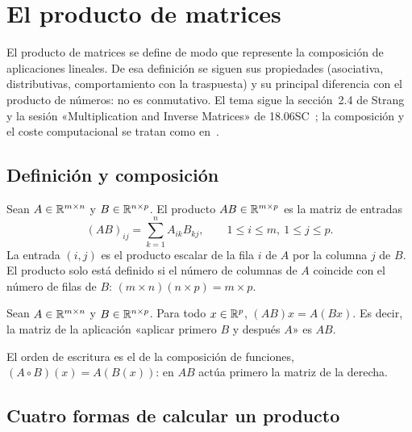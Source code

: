 \chapter{El producto de matrices}
\label{tema:4}

El producto de matrices se define de modo que represente la composición de aplicaciones lineales. De esa definición se siguen sus propiedades (asociativa, distributivas, comportamiento con la traspuesta) y su principal diferencia con el producto de números: no es conmutativo. El tema sigue la sección~2.4 de Strang~\cite{strang} y la sesión «Multiplication and Inverse Matrices» de 18.06SC~\cite{mit1806sc}; la composición y el coste computacional se tratan como en~\cite[§10.1 y §10.2]{vmls}.

\section{Definición y composición}

\begin{definicion}\label{def:producto}
Sean $A\in\mathbb{R}^{m\times n}$ y $B\in\mathbb{R}^{n\times p}$. El producto $AB\in\mathbb{R}^{m\times p}$ es la matriz de entradas
\[
(AB)_{ij}=\sum_{k=1}^{n}A_{ik}B_{kj},\qquad 1\le i\le m,\ 1\le j\le p.
\]
La entrada $(i,j)$ es el producto escalar de la fila $i$ de $A$ por la columna $j$ de $B$. El producto solo está definido si el número de columnas de $A$ coincide con el número de filas de $B$: $(m\times n)(n\times p)=m\times p$.
\end{definicion}

\begin{teorema}\label{teo:composicion}
Sean $A\in\mathbb{R}^{m\times n}$ y $B\in\mathbb{R}^{n\times p}$. Para todo $x\in\mathbb{R}^{p}$, $(AB)x=A(Bx)$. Es decir, la matriz de la aplicación «aplicar primero $B$ y después $A$» es $AB$.
\end{teorema}

El orden de escritura es el de la composición de funciones, $(A\circ B)(x)=A(B(x))$: en $AB$ actúa primero la matriz de la derecha.

\addtocounter{definicion}{1}%

\section{Cuatro formas de calcular un producto}

